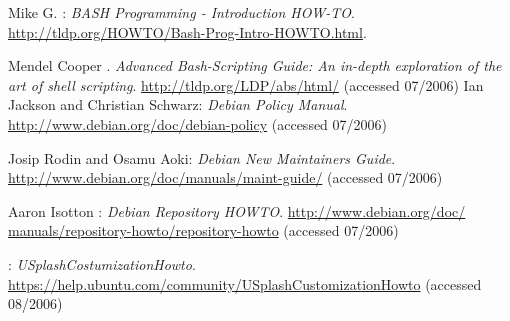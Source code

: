 
\bigskip{\par}
\backmatter
{}
\begin{thebibliography}{99}
 Mike G. : \newblock \emph{BASH %
	Programming - Introduction HOW-TO}. \href{http://tldp.org/HOWTO/Bash-Prog%
	-Intro-HOWTO.html}{http://tldp.org/HOWTO/Bash-Prog-Intro-HOWTO.html}.

 Mendel Cooper . \newblock
	\emph{Advanced Bash-Scripting Guide: An in-depth exploration of the %
	art of shell scripting}. \href{http://tldp.org/LDP/abs/html/}%
	{http://tldp.org/LDP/abs/html/} (accessed 07/2006)
 Ian Jackson and Christian Schwarz: \newblock
	\emph{Debian Policy Manual}.
	\href{http://www.debian.org/doc/debian-policy}%
	{http://www.debian.org/doc/debian-policy} (accessed 07/2006)

 Josip Rodin and Osamu Aoki: \newblock
	\emph{Debian New Maintainers Guide}.
	\href{http://www.debian.org/doc/manuals/maint-guide/}%
	{http://www.debian.org/doc/manuals/maint-guide/} (accessed 07/2006)

 Aaron Isotton :
	\newblock \emph{Debian Repository HOWTO}. \href{http://www.debian.org/doc/%
	manuals/repository-howto/repository-howto}{http://www.debian.org/doc/%
	manuals/repository-howto/repository-howto} (accessed 07/2006)

: \emph{USplashCostumizationHowto}.\\
	\href{https://help.ubuntu.com/community/USplashCustomizationHowto}
		{https://help.ubuntu.com/community/USplashCustomizationHowto}
	(accessed 08/2006)

\end{thebibliography}
